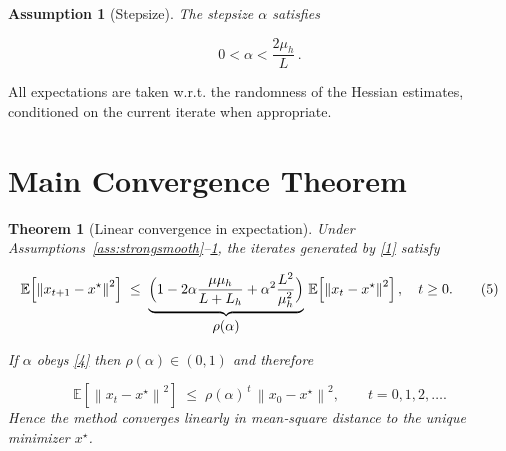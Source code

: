 \documentclass{article}
\newtheorem{theorem}{Theorem}
\newtheorem{assumption}{Assumption}
\newcommand{\E}{\mathbb{E}}
\newcommand{\norm}[1]{\left\|#1\right\|}
\begin{document}
\begin{assumption}[Stepsize]\label{ass:stepsize}
The stepsize $\alpha$ satisfies  

\[
0<\alpha<\frac{2\mu_h}{L}\, .
\tag{4}
\]
\end{assumption}

All expectations are taken w.r.t. the randomness of the Hessian estimates, conditioned on the current iterate when appropriate.

\section*{Main Convergence Theorem}
\begin{theorem}[Linear convergence in expectation]\label{thm:linear}
Under Assumptions~\ref{ass:strongsmooth}–\ref{ass:stepsize}, the iterates generated by \eqref{1} satisfy  

\[
\E\!\left[\norm{x_{t+1}-x^{\star}}^{2}\right]
\;\le\;
\underbrace{\Bigl(1-2\alpha\frac{\mu\mu_h}{L+L_h}
      +\alpha^{2}\frac{L^{2}}{\mu_h^{2}}\Bigr)}_{\displaystyle\rho(\alpha)}
      \,\E\!\left[\norm{x_{t}-x^{\star}}^{2}\right],
\quad t\ge0 .
\tag{5}
\]

If $\alpha$ obeys \eqref{4} then $\rho(\alpha)\in(0,1)$ and therefore  

\[
\E\!\left[\norm{x_{t}-x^{\star}}^{2}\right]
\;\le\;
\rho(\alpha)^{\,t}\,\norm{x_{0}-x^{\star}}^{2},
\qquad t=0,1,2,\dots .
\tag{6}
\]
Hence the method converges linearly in mean‑square distance to the unique minimizer $x^{\star}$.
\end{theorem}
\end{document}
